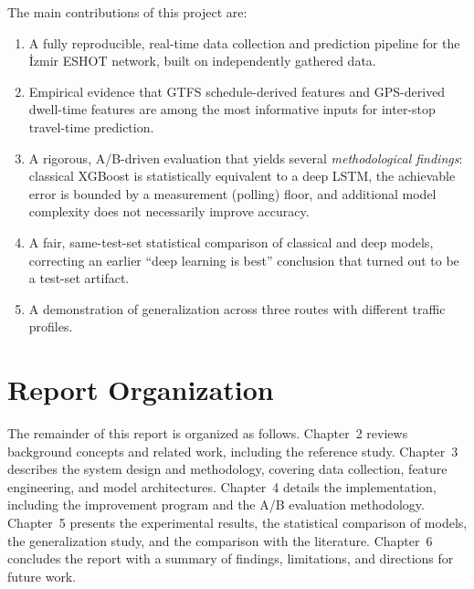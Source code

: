 The main contributions of this project are:

\begin{enumerate}
    \item A fully reproducible, real-time data collection and prediction pipeline for the İzmir ESHOT network, built on independently gathered data.
    \item Empirical evidence that GTFS schedule-derived features and GPS-derived dwell-time features are among the most informative inputs for inter-stop travel-time prediction.
    \item A rigorous, A/B-driven evaluation that yields several \emph{methodological findings}: classical XGBoost is statistically equivalent to a deep LSTM, the achievable error is bounded by a measurement (polling) floor, and additional model complexity does not necessarily improve accuracy.
    \item A fair, same-test-set statistical comparison of classical and deep models, correcting an earlier ``deep learning is best'' conclusion that turned out to be a test-set artifact.
    \item A demonstration of generalization across three routes with different traffic profiles.
\end{enumerate}

\section{Report Organization}

The remainder of this report is organized as follows. Chapter~2 reviews background concepts and related work, including the reference study. Chapter~3 describes the system design and methodology, covering data collection, feature engineering, and model architectures. Chapter~4 details the implementation, including the improvement program and the A/B evaluation methodology. Chapter~5 presents the experimental results, the statistical comparison of models, the generalization study, and the comparison with the literature. Chapter~6 concludes the report with a summary of findings, limitations, and directions for future work.
